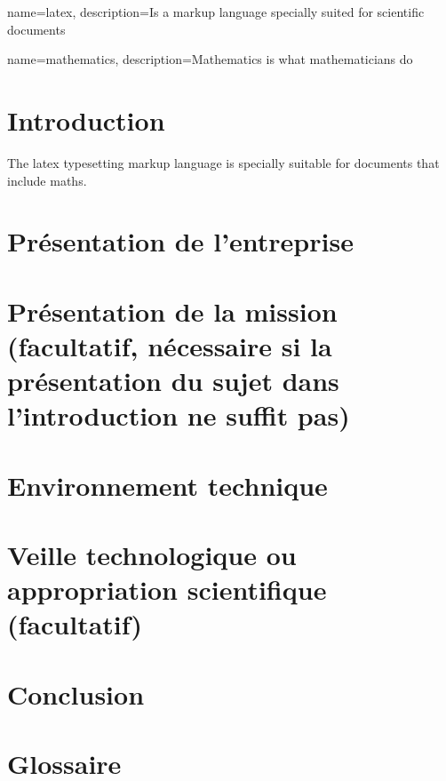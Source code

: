\documentclass{article}
\begin{document}


{
    name=latex,
    description={Is a markup language specially suited 
    for scientific documents}
}

{
    name=mathematics,
    description={Mathematics is what mathematicians do}
}


\newpage

\newpage

\renewcommand{\contentsname}{Table des matières}
\tableofcontents

\newpage


\renewcommand{\listfigurename}{Table des figures}
\listoffigures

\newpage

\section{Introduction}
The \Gls{latex} typesetting markup language is specially suitable 
for documents that include \gls{maths}. 


\section{Présentation de l'entreprise} 

\section{Présentation de la mission (facultatif, nécessaire si la présentation du sujet dans l'introduction ne suffit pas) }

\section{Environnement technique} 

\section{Veille technologique ou appropriation scientifique (facultatif)} 



\section{Conclusion} 

\section{Glossaire}
\clearpage
\printglossary[title={Glossaire}]
\end{document}
